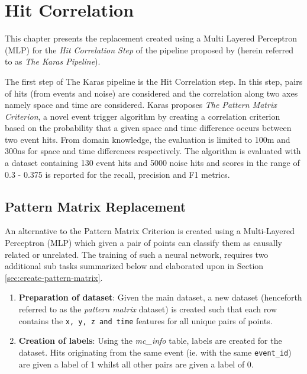 
\chapter{Hit Correlation} %

% 
This chapter presents the replacement created using a Multi Layered
Perceptron (MLP) for the \textit{Hit Correlation Step} of the pipeline
proposed by \cite{karas2019data} (herein referred to as \textit{The
  Karas Pipeline}).

The first step of The Karas pipeline is the Hit Correlation step. In
this step, pairs of hits (from events and noise) are considered and
the correlation along two axes namely space and time are considered.
Karas proposes \textit{The Pattern Matrix Criterion}, a novel event
trigger algorithm by creating a correlation criterion based on the
probability that a given space and time difference occurs between two
event hits. From domain knowledge, the evaluation is limited to 100m
and 300ns for space and time differences respectively. The algorithm
is evaluated with a dataset containing 130 event hits and 5000 noise
hits and scores in the range of 0.3 - 0.375 is reported for the
recall, precision and F1 metrics.

\section{Pattern Matrix Replacement}
An alternative to the Pattern Matrix Criterion is created using a
Multi-Layered Perceptron (MLP) which given a pair of points can
classify them as causally related or unrelated. The training of such a
neural network, requires two additional sub tasks summarized below and
elaborated upon in Section \ref{sec:create-pattern-matrix}.

\begin{enumerate}
\item \textbf{Preparation of dataset}: Given the main dataset, a new
  dataset (henceforth referred to as the \textit{pattern matrix}
  dataset) is created such that each row contains the \texttt{x, y, z
    and time} features for all unique pairs of points.
\item \textbf{Creation of labels}: Using the \textit{mc\_info} table,
  labels are created for the dataset. Hits originating from the same
  event (ie. with the same \texttt{event\_id}) are given a label of 1
  whilst all other pairs are given a label of 0.
\end{enumerate}

